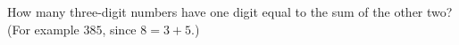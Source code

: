 How many three-digit numbers have one digit equal to the sum of the other two? (For example $385$, since $8=3+5$.)
